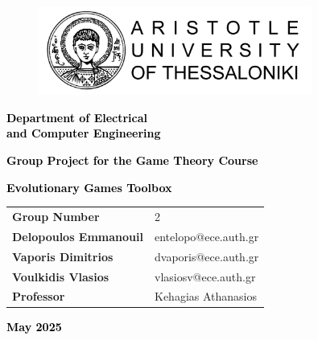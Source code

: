 \documentclass[12pt]{article}
\begin{document}
\begin{titlepage}
\centering
\begin{figure}[H]
\centering
\includegraphics[width=0.8\textwidth]{banner-horizontal-black-en.png}\par %
\end{figure}
\vspace{18pt}
\textcolor{black}{\Large \bfseries Department of Electrical\\ and Computer Engineering\\}\par
\vspace{1cm}
\vfill
\textcolor{black}{\Large \bfseries Group Project for the Game Theory Course}\par
\vspace{12pt}
\textcolor{black}{\large \bfseries Evolutionary Games Toolbox}\par

\vspace{0.5cm} %
\vfill
{}%
%
{\large
\def\arraystretch{1.3}
\begin{tabularx}{\textwidth}{ R|L }
\textbf{Group Number}                			 & 2           \\
\textbf{Delopoulos Emmanouil}      & entelopo@ece.auth.gr \\
\textbf{Vaporis Dimitrios}        & dvaporis@ece.auth.gr \\
\textbf{Voulkidis Vlasios}      & vlasiosv@ece.auth.gr \\
\textbf{Professor}           & Kehagias Athanasios\\
\end{tabularx}
}
\vspace{0.5cm}
\vfill
\textcolor{black}{\large \bfseries May 2025}\par
\end{titlepage}
\restoregeometry
\end{document}
